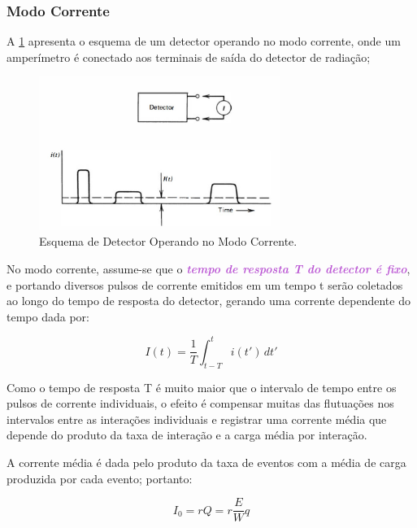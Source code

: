 \documentclass[11pt,a4paper]{article}
\begin{document}
		\subsubsection*{Modo Corrente}

			A  \ref{fig:esquemaModoCorrente} apresenta o esquema de um detector operando no modo corrente, onde um amperímetro é conectado aos terminais de saída do detector de radiação;

				\begin{figure}[h]
					\centering
					\includegraphics[width=0.7\textwidth]{Imagens/esquemaModoCorrente.jpg}
					\caption{Esquema de Detector Operando no Modo Corrente.}
					\label{fig:esquemaModoCorrente}
				\end{figure}
			
			No modo corrente, assume-se que o \textcolor{MediumOrchid}{\textit{\textbf{tempo de resposta T do detector é fixo}}}, e portando diversos pulsos de corrente emitidos em um tempo t serão coletados ao longo do tempo de resposta do detector, gerando uma corrente dependente do tempo dada por:
			
				\begin{equation}
					I(t) = \frac{1}{T} \int_{t-T}^{t} i (t') \,dt' 
				\end{equation}

			\noindent Como o tempo de resposta T é muito maior que o intervalo de tempo entre os pulsos de corrente individuais, o efeito é compensar muitas das flutuações nos intervalos entre as interações individuais e registrar uma corrente média que depende do produto da taxa de interação e a carga média por interação.

			A corrente média é dada pelo produto da taxa de eventos com a média de carga produzida por cada evento; portanto:

				\begin{equation}
					I_0 = rQ = r\frac{E}{W}q
				\end{equation}
			
\end{document}
